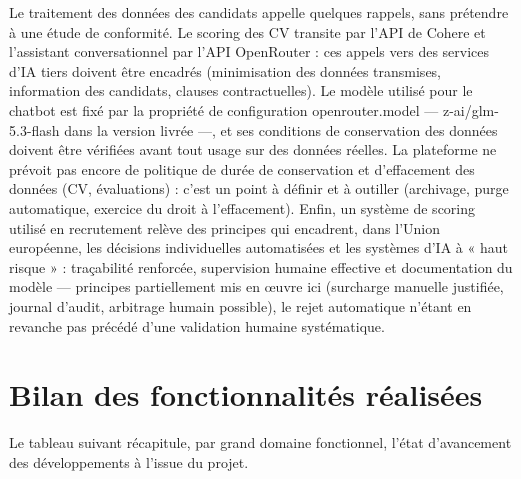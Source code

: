 Le traitement des données des candidats appelle quelques rappels, sans prétendre à une étude de conformité. Le scoring des CV transite par l’API de Cohere et l’assistant conversationnel par l’API OpenRouter : ces appels vers des services d’IA tiers doivent être encadrés (minimisation des données transmises, information des candidats, clauses contractuelles). Le modèle utilisé pour le chatbot est fixé par la propriété de configuration openrouter.model — z-ai/glm-5.3-flash dans la version livrée —, et ses conditions de conservation des données doivent être vérifiées avant tout usage sur des données réelles. La plateforme ne prévoit pas encore de politique de durée de conservation et d’effacement des données (CV, évaluations) : c’est un point à définir et à outiller (archivage, purge automatique, exercice du droit à l’effacement). Enfin, un système de scoring utilisé en recrutement relève des principes qui encadrent, dans l’Union européenne, les décisions individuelles automatisées \cite{ref17,ref18} et les systèmes d’IA à « haut risque » \cite{ref20} : traçabilité renforcée, supervision humaine effective et documentation du modèle — principes partiellement mis en œuvre ici (surcharge manuelle justifiée, journal d’audit, arbitrage humain possible), le rejet automatique n’étant en revanche pas précédé d’une validation humaine systématique.

\section{Bilan des fonctionnalités réalisées}
\label{sec_4_7}
\begingroup
\setlength{\emergencystretch}{4em}
Le tableau suivant récapitule, par grand domaine fonctionnel, l’état d’avancement des développements à l’issue du projet.
\par\endgroup

